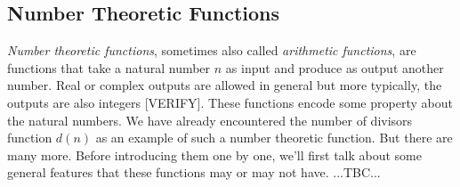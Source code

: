 
\subsection{Number Theoretic Functions}
\emph{Number theoretic functions}, sometimes also called \emph{arithmetic functions}, are functions that take a natural number $n$ as input and produce as output another number. Real or complex outputs are allowed in general but more typically, the outputs are also integers [VERIFY]. These functions encode some property about the natural numbers. We have already encountered the number of divisors function $d(n)$ as an example of such a number theoretic function. But there are many more. Before introducing them one by one, we'll first talk about some general features that these functions may or may not have. ...TBC...










